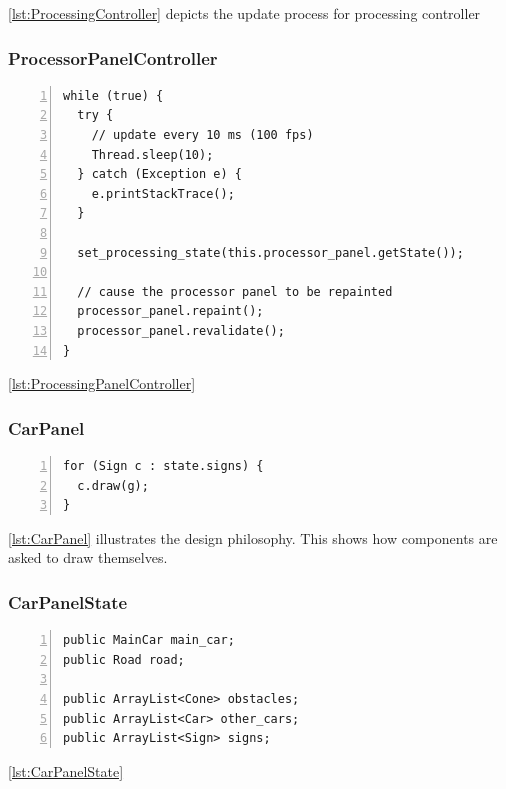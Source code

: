 \documentclass{article} %
\begin{document}
\ref{lst:ProcessingController} depicts the update process for processing controller

\subsubsection{ProcessorPanelController}
\begin{lstlisting}[caption={Processing Panel Update Procedure},label={lst:ProcessingPanelController},numbers=left]
while (true) {
  try {
    // update every 10 ms (100 fps)
    Thread.sleep(10);
  } catch (Exception e) {
    e.printStackTrace();
  }

  set_processing_state(this.processor_panel.getState());
  
  // cause the processor panel to be repainted
  processor_panel.repaint();
  processor_panel.revalidate();
}
\end{lstlisting}

\ref{lst:ProcessingPanelController}

\subsubsection{CarPanel}
\begin{lstlisting}[caption={Ask Signs to Draw Themselves},label={lst:CarPanel},numbers=left]
for (Sign c : state.signs) {
  c.draw(g);
}
\end{lstlisting}

\ref{lst:CarPanel} illustrates the design philosophy. 
This shows how components are asked to draw themselves.

\subsubsection{CarPanelState}
\begin{lstlisting}[caption={Car Panel State maintains all objects drawn on the screen},label={lst:CarPanelState},numbers=left]
public MainCar main_car;
public Road road;

public ArrayList<Cone> obstacles;
public ArrayList<Car> other_cars;
public ArrayList<Sign> signs;
\end{lstlisting}

\ref{lst:CarPanelState}
\end{document}
